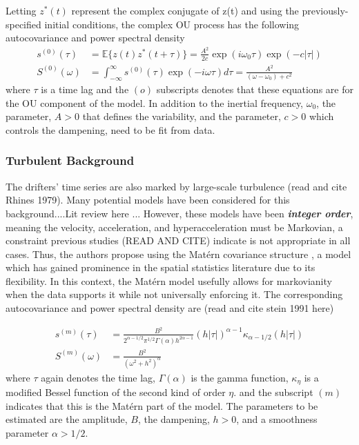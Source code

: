 \documentclass{stat572Style}
\begin{document}
Letting $z^{*}(t)$ represent the complex conjugate of z(t) and using the previously-specified initial conditions, the complex OU process has the following  autocovariance  and power spectral density
\begin{align}
\label{eq: ouAC}
s^{(0)}(\tau) &= \mathbb{E}\{z(t)z^{*}(t + \tau) \} = \frac{A^{2}}{2c} \exp(i \omega_{0}\tau) \exp(-c|\tau|)\\
\label{eq: ouPSD}
S^{(0)}(\omega) &= \int_{-\infty}^{\infty} s^{(0)}(\tau) \exp (-i \omega \tau) d \tau = \frac{A^{2}}{(\omega - \omega_{0}) + c^{2}}
\end{align}
where $\tau$ is a time lag and the $(o)$ subscripts denotes that these equations are for the OU component of the model.  In addition to the inertial frequency, $\omega_{0}$, the parameter, $A > 0$ that defines the variability, and the parameter, $c >0$ which controls the dampening,  need to be fit from data. 
\subsubsection{Turbulent Background}
The drifters' time series are also marked by large-scale turbulence (read and cite Rhines 1979). Many potential models have been considered for this background....Lit review here ... However, these models have been \textbf{\it{integer order}}, meaning the velocity, acceleration, and hyperacceleration must be Markovian, a constraint previous studies (READ AND CITE) indicate is not appropriate in all cases. Thus, the authors propose using the Mat\'{e}rn covariance structure \citep{Gneiting2012}, a model which has gained prominence in the spatial statistics literature due to its flexibility. In this context, the Mat\'{e}rn model usefully  allows for markovianity when the data supports it while not universally enforcing it. The corresponding autocovariance and power spectral density are (read and cite stein 1991 here)

\begin{align}
\label{eq: maternAC}
s^{(m)}(\tau) &= \frac{B^{2}}{2^{\alpha - 1/2}\pi^{1/2} \Gamma(\alpha) h^{2 \alpha - 1}}(h|\tau|)^{\alpha - 1}\kappa_{\alpha - 1/2}(h|\tau|)\\
\label{eq: maternPSD}
S^{(m)}(\omega) &= \frac{B^{2}}{(\omega^{2} + h^{2})^{\alpha}}
\end{align}
where $\tau$ again denotes the time lag, $\Gamma(\alpha)$ is the gamma function,  $\kappa_{\eta}$ is a modified Bessel function of the second kind of order $\eta$. and the subscript $(m)$ indicates that this is the Mat\'{e}rn part of the model. The parameters to be estimated are the amplitude, $B$, the dampening, $h > 0$, and a smoothness parameter $\alpha > 1/2$. 
\end{document}
